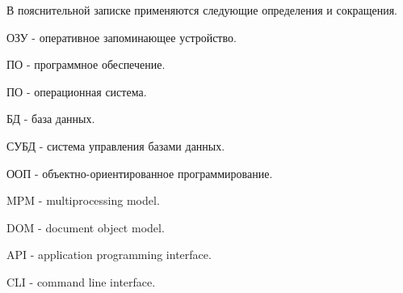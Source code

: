 
В пояснительной записке применяются следующие определения и сокращения.

ОЗУ - оперативное запоминающее устройство.

ПО - программное обеспечение.

ПО - операционная система.

БД - база данных.

СУБД - система управления базами данных.

ООП - объектно-ориентированное программирование.

MPM - multiprocessing model.

DOM - document object model.

API - application programming interface.

CLI - command line interface.


\clearpage
